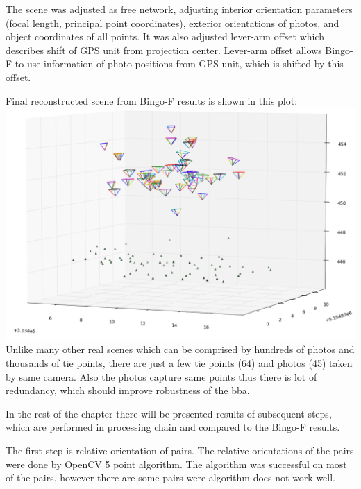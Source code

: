 \documentclass[a4paper,12pt]{report}
\begin{document}
The scene was adjusted as free network, adjusting interior orientation parameters (focal length, principal point coordinates),
exterior orientations of photos, and object coordinates of all points. It was also adjusted lever-arm offset which describes 
shift of GPS unit from projection center.  Lever-arm offset allows Bingo-F to use information of photo positions from GPS unit,
which is shifted by this offset.  

Final reconstructed  scene from Bingo-F results is shown in this plot:
\includegraphics[scale=0.5]{figures/bingo_result.png}
Unlike many other real scenes which can be comprised by hundreds of photos and thousands of tie points,   
there are just a few tie points (64) and photos (45) taken by same camera. Also the photos capture same points thus there 
is lot of redundancy, which should improve robustness of the bba. 

In the rest of the chapter there will be presented results of subsequent steps, which are performed in processing chain and compared 
to the Bingo-F results.

The first step is relative orientation of pairs. The relative orientations of the pairs were done by OpenCV 5 point algorithm.
The algorithm was successful on most of the pairs, however there are some pairs were algorithm does not work well.
\end{document}
